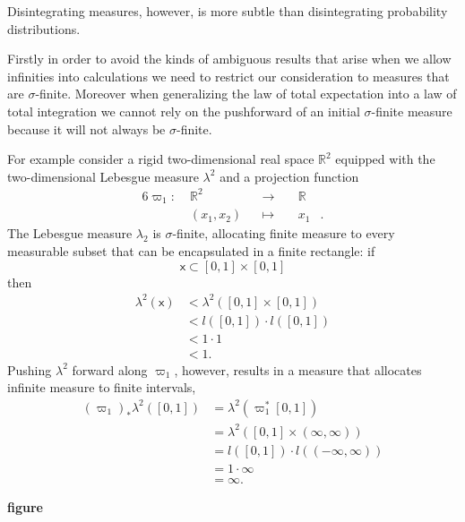 \documentclass[11pt, oneside]{article}
\begin{document}
Disintegrating measures, however, is more subtle than disintegrating probability 
distributions.

Firstly in order to avoid the kinds of ambiguous results that arise when we allow
infinities into calculations we need to restrict our consideration to measures that 
are $\sigma$-finite.  Moreover when generalizing the law of total expectation into 
a law of total integration we cannot rely on the pushforward of an initial  
$\sigma$-finite measure because it will not always be $\sigma$-finite.

For example consider a rigid two-dimensional real space $\mathbb{R}^{2}$ equipped
with the two-dimensional Lebesgue measure $\lambda^{2}$ and a projection function
\begin{alignat*}{6}
\varpi_{1} :\; &\mathbb{R}^{2}& &\rightarrow& \; &\mathbb{R}&
\\
&(x_{1}, x_{2})& &\mapsto& &x_{1}&.
\end{alignat*}
The Lebesgue measure $\lambda_{2}$ is $\sigma$-finite, allocating finite measure 
to every measurable subset that can be encapsulated in a finite rectangle: if
%
\begin{equation*}
\mathsf{x} \subset [0, 1] \times [0, 1]
\end{equation*}
%
then
\begin{align*}
\lambda^{2}(\mathsf{x}) 
&< 
\lambda^{2}( [0, 1] \times [0, 1] )
\\
&<
l([0, 1]) \cdot l([0, 1])
\\
&<
1 \cdot 1
\\
&< 
1.
\end{align*}
Pushing $\lambda^{2}$ forward along $\varpi_{1}$, however, results in a measure 
that allocates infinite measure to finite intervals,
%
\begin{align*}
(\varpi_{1})_{*} \lambda^{2} ( [0, 1] ) 
&= 
\lambda^{2}( \varpi_{1}^{*} [0, 1]) 
\\
&= \lambda^{2}( [0, 1] \times (\infty, \infty) ) 
\\
&= l([0, 1]) \cdot l( (-\infty, \infty) )
\\
&= 1 \cdot \infty
\\
&= \infty.
\end{align*}

\textbf{figure}
\end{document}
